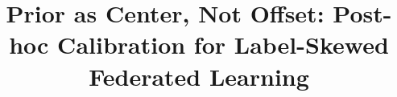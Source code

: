 \documentclass{svproc}
\begin{document}
\mainmatter
\title{Prior as Center, Not Offset: Post-hoc Calibration for Label-Skewed Federated Learning}
\author{}
\authorrunning{}
\tocauthor{}
\institute{}
\maketitle











\end{document}
